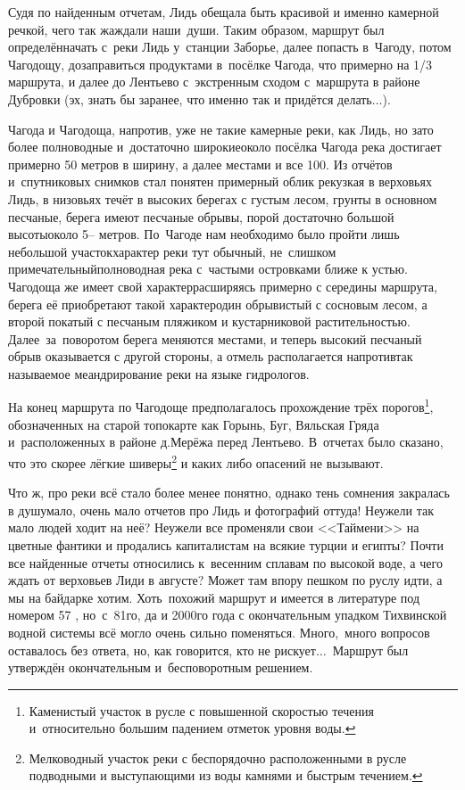 Судя по найденным отчетам, Лидь обещала быть красивой и именно камерной речкой, чего так жаждали наши~души. Таким образом, маршрут был определён\mdash начать с~реки Лидь у~станции Заборье, далее попасть в~Чагоду, потом Чагодощу, дозаправиться продуктами в~посёлке Чагода, что примерно на 1/3 маршрута, и далее до Лентьево с~экстренным сходом с~маршрута в районе Дубровки (эх, знать бы заранее, что именно так и придётся делать$\ldots$).
 
Чагода и Чагодоща, напротив, уже не такие камерные реки, как Лидь, но зато более полноводные и~достаточно широкие\mdash около посёлка Чагода река достигает примерно 50 метров в ширину, а далее местами и все 100. Из отчётов и~спутниковых снимков стал понятен примерный облик рек\mdash узкая в верховьях Лидь, в низовьях течёт в высоких берегах с густым лесом, грунты в основном песчаные, берега имеют песчаные обрывы, порой достаточно большой высоты\mdash около 5\thinspace-- метров. По~Чагоде нам необходимо было пройти лишь небольшой участок\mdash характер реки тут обычный, не~слишком примечательный\mdash полноводная река с~частыми островками ближе к устью. Чагодоща же имеет свой характер\mdash расширяясь примерно с середины маршрута, берега её приобретают такой характер\mdash один обрывистый с сосновым лесом, а второй покатый с песчаным пляжиком и кустарниковой растительностью. Далее~за~поворотом берега меняются местами, и теперь высокий песчаный обрыв оказывается с другой стороны, а отмель располагается напротив\mdash так называемое меандрирование реки на языке гидрологов.

На конец маршрута по Чагодоще предполагалось прохождение трёх порогов\footnote[1]{Каменистый участок в русле с повышенной скоростью течения и~относительно большим падением отметок уровня воды.}, обозначенных на старой топокарте как Горынь, Буг, Вяльская Гряда и~расположенных в районе д.\thinspace Мерёжа перед Лентьево. В~отчетах было сказано, что это скорее лёгкие шиверы\footnote[1]{Мелководный участок реки с беспорядочно расположенными в русле подводными и выступающими из воды камнями и быстрым течением.} и каких либо опасений не вызывают.

Что ж, про реки всё стало более менее понятно, однако тень сомнения закралась в душу\mdash мало, очень мало отчетов про Лидь и фотографий оттуда! Неужели так мало людей ходит на неё? Неужели все променяли свои <<Таймени>> на цветные фантики и продались капиталистам на всякие турции и египты? Почти все найденные отчеты относились к~весенним сплавам по высокой воде, а чего ждать от верховьев Лиди в августе? Может там впору пешком по руслу идти, а мы на байдарке хотим. Хоть~похожий маршрут и имеется в литературе под номером 57 \cite{Рыжавский1,Рыжавский2}, но~с~81\sdash го, да и 2000\sdash го года с окончательным упадком Тихвинской водной системы всё могло очень сильно поменяться. Много,~много вопросов оставалось без ответа, но, как говорится, кто не рискует$\ldots$~Маршрут был утверждён окончательным и~бесповоротным решением.

